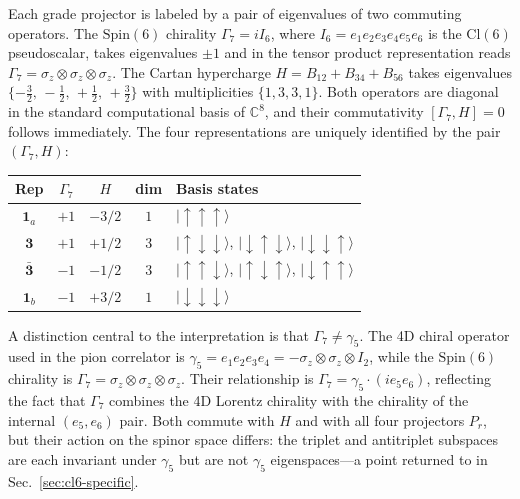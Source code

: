 \documentclass[12pt]{article}
\theoremstyle{definition}
\theoremstyle{remark}
\newcommand{\cl}{\mathrm{Cl}}           %
\newcommand{\spin}{\mathrm{Spin}}       %
\newcommand{\GaSeven}{\Gamma_7}                      %
\newcommand{\Isix}{I_6}                              %
\begin{document}
	Each grade projector is labeled by a pair of eigenvalues of two commuting
	operators.  The $\spin(6)$ chirality $\GaSeven = i\Isix$, where
	$\Isix = e_1 e_2 e_3 e_4 e_5 e_6$ is the $\cl(6)$ pseudoscalar, takes
	eigenvalues $\pm1$ and in the tensor product representation reads
	$\GaSeven = \sigma_z\otimes\sigma_z\otimes\sigma_z$.  The Cartan hypercharge
	$H = B_{12}+B_{34}+B_{56}$ takes eigenvalues
	$\{-\tfrac{3}{2},\,-\tfrac{1}{2},\,+\tfrac{1}{2},\,+\tfrac{3}{2}\}$ with
	multiplicities $\{1,3,3,1\}$.  Both operators are diagonal in the standard
	computational basis of $\mathbb{C}^8$, and their commutativity $[\GaSeven, H]=0$
	follows immediately.  The four representations are uniquely identified by the
	pair $(\GaSeven, H)$:
	\begin{center}
		\begin{tabular}{@{}ccccp{4.5cm}@{}}
			\toprule
			Rep & $\GaSeven$ & $H$ & dim & Basis states \\
			\midrule
			$\mathbf{1}_a$     & $+1$ & $-3/2$ & $1$
			& $|\!\uparrow\uparrow\uparrow\rangle$ \\[3pt]
			$\mathbf{3}$       & $+1$ & $+1/2$ & $3$
			& $|\!\uparrow\downarrow\downarrow\rangle$,
			$|\!\downarrow\uparrow\downarrow\rangle$,
			$|\!\downarrow\downarrow\uparrow\rangle$ \\[3pt]
			$\bar{\mathbf{3}}$ & $-1$ & $-1/2$ & $3$
			& $|\!\uparrow\uparrow\downarrow\rangle$,
			$|\!\uparrow\downarrow\uparrow\rangle$,
			$|\!\downarrow\uparrow\uparrow\rangle$ \\[3pt]
			$\mathbf{1}_b$     & $-1$ & $+3/2$ & $1$
			& $|\!\downarrow\downarrow\downarrow\rangle$ \\
			\bottomrule
		\end{tabular}
	\end{center}
	
	A distinction central to the interpretation is that $\GaSeven\neq\gamma_5$.
	The 4D chiral operator used in the pion correlator is
	$\gamma_5 = e_1 e_2 e_3 e_4 = -\sigma_z\otimes\sigma_z\otimes I_2$, while
	the $\spin(6)$ chirality is
	$\GaSeven = \sigma_z\otimes\sigma_z\otimes\sigma_z$.  Their relationship is
	$\GaSeven = \gamma_5\cdot(ie_5 e_6)$, reflecting the fact that $\GaSeven$
	combines the 4D Lorentz chirality with the chirality of the internal $(e_5,e_6)$
	pair.  Both commute with $H$ and with all four projectors $P_r$, but their
	action on the spinor space differs: the triplet and antitriplet subspaces are
	each invariant under $\gamma_5$ but are not $\gamma_5$ eigenspaces---a point
	returned to in Sec.~\ref{sec:cl6-specific}.
	
\end{document}
